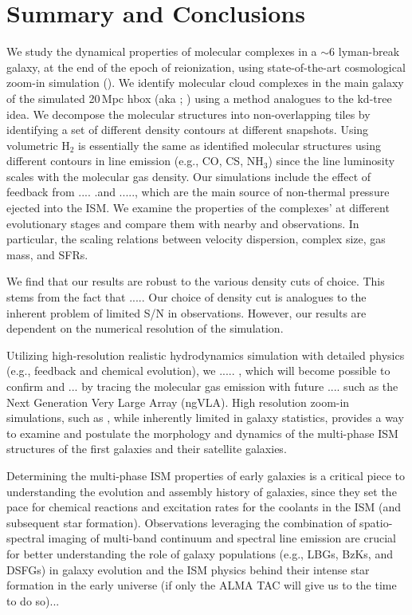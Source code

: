 \documentclass[apj]{emulateapj} %
\begin{document}
\section{Summary and Conclusions}      \label{sec:conclusion}

We study the dynamical properties of molecular complexes in a \z$\sim$6 lyman-break galaxy, 
at the end of the epoch of reionization, using state-of-the-art cosmological zoom-in simulation 
(). We identify molecular cloud complexes in the main galaxy of the 
simulated 20\,Mpc h\pmOne box (aka \flower; \citealt{Pallottini17a}) using a method analogues 
to the kd-tree idea. We decompose the molecular structures into non-overlapping tiles 
by identifying a set of different density contours at different snapshots. 
Using volumetric H$_2$ is essentially the same as identified molecular structures using
different contours in line emission (e.g., CO, CS, NH$_3$) since the line luminosity scales with the molecular gas density.
Our simulations include the effect of feedback from .... .and ....., which are the main source 
of non-thermal pressure ejected into the ISM.
We examine the properties of the complexes' at different evolutionary stages and compare 
them with nearby and \highz observations. In particular,
the scaling relations between velocity dispersion, complex size, gas mass, 
and SFRs.

We find that our results are robust to the various density cuts of choice. 
This stems from the 
fact that ..... Our choice of density cut is analogues to the inherent problem of limited S/N 
in observations.
However, our results are dependent on the numerical resolution of the simulation. 

Utilizing high-resolution realistic hydrodynamics simulation with 
detailed physics (e.g., feedback and chemical evolution), we 
..... , which will become possible to confirm and ... by tracing 
the molecular gas emission with future .... such as the Next Generation Very Large Array (ngVLA).
High resolution zoom-in simulations, such as , while inherently limited in galaxy 
statistics, provides a way to examine and postulate the morphology and dynamics of  
the multi-phase ISM structures of the first galaxies and their satellite galaxies.

Determining the multi-phase ISM properties of early galaxies 
is a critical piece to understanding the evolution and 
assembly history of galaxies, since they set the pace 
for chemical reactions and excitation rates for the coolants in the ISM (and subsequent star formation). 
Observations leveraging the combination of spatio-spectral imaging of 
multi-band continuum and spectral line emission are crucial for better understanding 
the role of \highz galaxy populations 
(e.g., LBGs, BzKs, and DSFGs) in 
galaxy evolution and the ISM physics behind their intense star formation in the early universe 
(if only the ALMA TAC will give us to the time to do so)...
\end{document}

